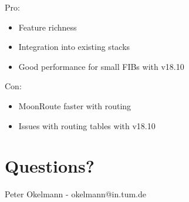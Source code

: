 \begin{frame}

Pro: 
\begin{itemize}
    \item Feature richness
    \item Integration into existing stacks
    \item Good performance for small FIBs with v18.10
\end{itemize}
Con:
\begin{itemize}
    \item MoonRoute faster with routing
    \item Issues with routing tables with v18.10
\end{itemize}

\end{frame}


\section{Questions?}
\begin{frame}
Peter Okelmann - okelmann@in.tum.de
\end{frame}




